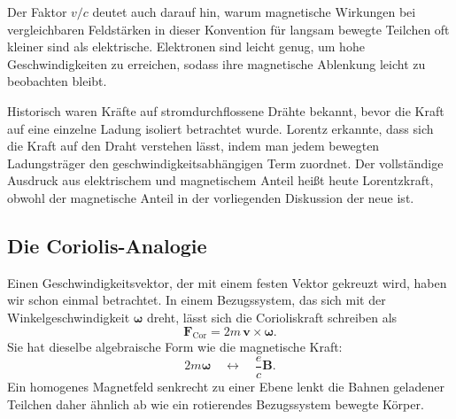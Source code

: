 Der Faktor \(v/c\) deutet auch darauf hin, warum magnetische Wirkungen bei vergleichbaren Feldstärken in dieser Konvention für langsam bewegte Teilchen oft kleiner sind als elektrische. Elektronen sind leicht genug, um hohe Geschwindigkeiten zu erreichen, sodass ihre magnetische Ablenkung leicht zu beobachten bleibt.

Historisch waren Kräfte auf stromdurchflossene Drähte bekannt, bevor die Kraft auf eine einzelne Ladung isoliert betrachtet wurde. Lorentz erkannte, dass sich die Kraft auf den Draht verstehen lässt, indem man jedem bewegten Ladungsträger den geschwindigkeitsabhängigen Term zuordnet. Der vollständige Ausdruck aus elektrischem und magnetischem Anteil heißt heute Lorentzkraft, obwohl der magnetische Anteil in der vorliegenden Diskussion der neue ist.

\begin{classroomqa}
\end{classroomqa}

\subsection{Die Coriolis-Analogie}

Einen Geschwindigkeitsvektor, der mit einem festen Vektor gekreuzt wird, haben wir schon einmal betrachtet. In einem Bezugssystem, das sich mit der Winkelgeschwindigkeit \(\boldsymbol\omega\) dreht, lässt sich die Corioliskraft schreiben als
\begin{equation}
  \mathbf F_{\mathrm{Cor}}
  =
  2m\,\mathbf v\times\boldsymbol\omega.
\end{equation}
Sie hat dieselbe algebraische Form wie die magnetische Kraft:
\begin{equation}
  2m\boldsymbol\omega
  \quad\longleftrightarrow\quad
  \frac{e}{c}\mathbf B.
\end{equation}
Ein homogenes Magnetfeld senkrecht zu einer Ebene lenkt die Bahnen geladener Teilchen daher ähnlich ab wie ein rotierendes Bezugssystem bewegte Körper.

